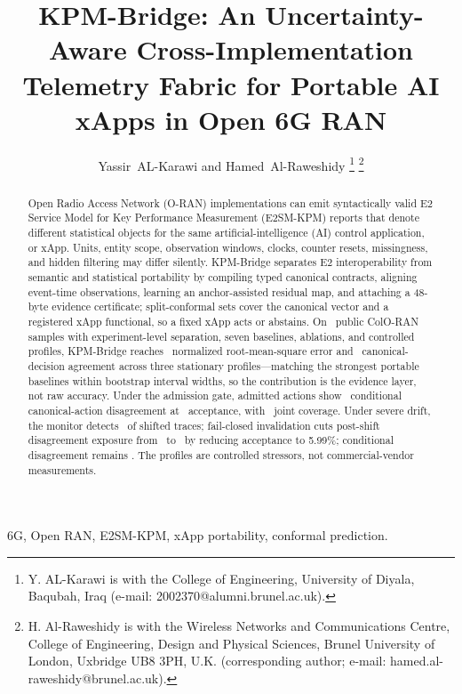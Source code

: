 \documentclass[10pt,journal,twoside]{IEEEtran}
\title{KPM-Bridge: An Uncertainty-Aware Cross-Implementation Telemetry Fabric for Portable AI xApps in Open 6G RAN}
\author{Yassir~AL-Karawi and Hamed~Al-Raweshidy%
\thanks{Y. AL-Karawi is with the College of Engineering, University of Diyala, Baqubah, Iraq (e-mail: 2002370@alumni.brunel.ac.uk).}%
\thanks{H. Al-Raweshidy is with the Wireless Networks and Communications Centre, College of Engineering, Design and Physical Sciences, Brunel University of London, Uxbridge UB8 3PH, U.K. (corresponding author; e-mail: hamed.al-raweshidy@brunel.ac.uk).}%
}
\begin{document}
\maketitle

\begin{abstract}
Open Radio Access Network (O-RAN) implementations can emit syntactically valid E2 Service Model for Key Performance Measurement (E2SM-KPM) reports that denote different statistical objects for the same artificial-intelligence (AI) control application, or xApp. Units, entity scope, observation windows, clocks, counter resets, missingness, and hidden filtering may differ silently. KPM-Bridge separates E2 interoperability from semantic and statistical portability by compiling typed canonical contracts, aligning event-time observations, learning an anchor-assisted residual map, and attaching a 48-byte evidence certificate; split-conformal sets cover the canonical vector and a registered xApp functional, so a fixed xApp acts or abstains. On \DatasetRows\ public ColO-RAN samples with experiment-level separation, seven baselines, ablations, and controlled profiles, KPM-Bridge reaches \StableNrmse\ normalized root-mean-square error and \StableAgreement\ canonical-decision agreement across three stationary profiles---matching the strongest portable baselines within bootstrap interval widths, so the contribution is the evidence layer, not raw accuracy. Under the admission gate, admitted actions show \StableSelectiveError\ conditional canonical-action disagreement at \StableAcceptance\ acceptance, with \StableCoverage\ joint coverage. Under severe drift, the monitor detects \DriftDetection\ of shifted traces; fail-closed invalidation cuts post-shift disagreement exposure from \NoDriftExposure\ to \DriftExposure\ by reducing acceptance to 5.99\%; conditional disagreement remains \DriftSelectiveError. The profiles are controlled stressors, not commercial-vendor measurements.
\end{abstract}

\begin{IEEEkeywords}
6G, Open RAN, E2SM-KPM, xApp portability, conformal prediction.
\end{IEEEkeywords}
\end{document}
